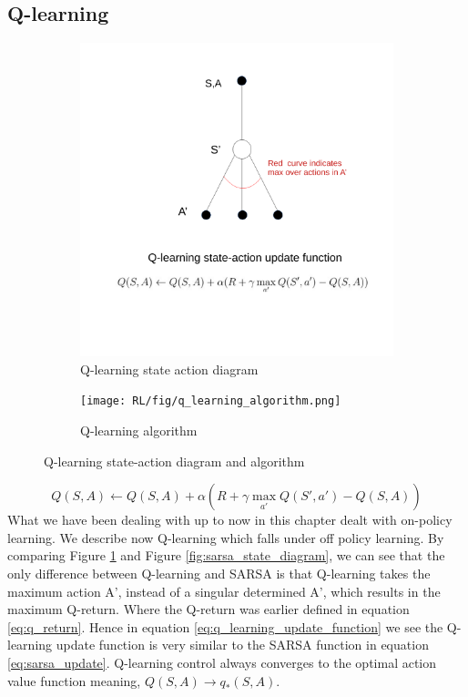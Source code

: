 \subsection{Q-learning}
\begin{figure}[!htb]
	\begin{subfigure}{0.5\textwidth}
		\centering
		\includegraphics[width=1\linewidth]{RL/fig/q_learning_state_diagram.pdf}
		\caption{Q-learning state action diagram\cite{David_Silver}}
		\label{fig:q_learning_state_action_diagram}
	\end{subfigure}
	\begin{subfigure}{0.5\textwidth}
		\centering
		\texttt{[image: RL/fig/q\_learning\_algorithm.png]}
		\caption{Q-learning algorithm\cite{David_Silver}}
		\label{fig:q_learning_algorithm}
	\end{subfigure}
	\caption{Q-learning state-action diagram and algorithm}
	\label{Q-learning}
\end{figure}
\begin{equation}
	Q(S,A) \leftarrow Q(S,A) + \alpha(R + \gamma\max\limits_{a'}Q(S',a') - Q(S,A))
	\label{eq:q_learning_update_function}
\end{equation}
What we have been dealing with up to now in this chapter dealt with on-policy learning.
We describe now Q-learning which falls under off policy learning. By comparing Figure \ref{fig:q_learning_state_action_diagram} and Figure \ref{fig:sarsa_state_diagram}, we can see that the only difference between Q-learning and SARSA is that Q-learning takes the maximum action A', instead of a singular determined A', which results in the maximum Q-return. Where the Q-return was earlier defined in equation \ref{eq:q_return}.
Hence in equation \ref{eq:q_learning_update_function} we see the Q-learning update function is very similar to the SARSA function in equation \ref{eq:sarsa_update}.
Q-learning control always converges to the optimal action value function meaning, $Q(S,A) \to q_*(S,A)$. 
